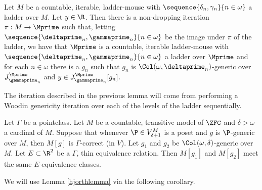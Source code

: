 \documentclass[oneside,12pt]{amsart}
\begin{document}
\begin{lemma}
\label{generic_over_all_windows}
Let $M$ be a countable, iterable, ladder-mouse
with $\sequence{\delta_n,\gamma_n}{n\in\omega}$ a ladder over $M$.
Let $y\in\R$.
Then there is a non-dropping iteration $\pi:M\to \Mprime$ such that,
letting $\sequence{\deltaprime_n,\gammaprime_n}{n\in\omega}$ be the image under $\pi$
of the ladder, we have that $\Mprime$ is a countable, iterable ladder-mouse
with $\sequence{\deltaprime_n,\gammaprime_n}{n\in\omega}$ a ladder over $\Mprime$
and for each $n\in\omega$ there is a $g_n$ such that $g_n$
is $\Col(\omega,\deltaprime_n)$-generic over
$J^{\Mprime}_{\gammaprime_n}$ and $y\in J^{\Mprime}_{\gammaprime_n}[g_n]$.
\end{lemma}

The iteration described in the previous lemma will come from performing a
Woodin genericity iteration over each of the levels of the ladder sequentially.

\begin{lemma}
\label{hjorthlemma}
Let $\Gamma$ be a pointclass.
Let $M$ be a countable, transitive model of $\ZFC$ and  $\delta>\omega$ a cardinal of $M$.
Suppose that whenever $\P\in V^M_{\delta+1}$ is a poset and $g$ is $\P$-generic over $M$, then
$M[g]$ is $\Gamma$-correct (in $V$). Let $g_1$ and $g_2$ be $\Col(\omega, \delta)$-generic over $M$.
Let $E\subset\R^2$ be a $\Gamma$, thin equivalence relation.
Then $M[g_1]$ and $M[g_2]$ meet the same $E$-equivalence classes.
\end{lemma}

We will use Lemma \ref{hjorthlemma} via the following corollary.
\end{document}
